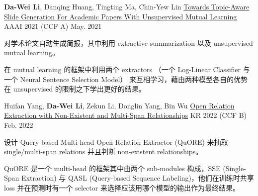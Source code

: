 

\begin{cventries}

  \cventry
    {\textbf{Da-Wei Li}, Danqing Huang, Tingting Ma, Chin-Yew Lin} %
    {\href{https://www.microsoft.com/en-us/research/publication/towards-topic-aware-slide-generation-for-academic-papers-with-unsupervised-mutual-learning/}{Towards Topic-Aware Slide Generation For Academic Papers With Unsupervised Mutual Learning}} %
    {AAAI 2021 (CCF A)} %
    {May. 2021} %
    {
      \begin{cvitems} %
        \item {对学术论文自动生成简报，其中利用 extractive summarization 以及 unsupervised mutual learning。}
        \item {在 mutual learning 的框架中利用两个 extractors （一个 Log-Linear Classifier 与一个 Neural Sentence Selection Model） 来互相学习，藉由两种模型各自的优势在 unsupervised 的限制之下学出更好的结果。}
      \end{cvitems}
    }

  \cventry
    {Huifan Yang, \textbf{Da-Wei Li}, Zekun Li, Donglin Yang, Bin Wu} %
    {\href{https://www.easychair.org/publications/preprint_open/jz3j}{Open Relation Extraction with Non-Existent and Multi-Span Relationships}} %
    {KR 2022 (CCF B)} %
    {Feb. 2022} %
    {
      \begin{cvitems} %
        \item {设计 Query-based Multi-head Open Relation Extractor (QuORE) 来抽取 single/multi-span relations 并且判断 non-existent relationships。}
        \item {QuORE 是一个 multi-head 的框架其中由两个 sub-modules 构成，SSE (Single-Span Extraction) 与 QASL (Query-based Sequence Labeling)，他们在训练时共享 loss 并在预测时有一个 selector 来选择应该用哪个模型的输出作为最终结果。}
      \end{cvitems}
    }


\end{cventries}
